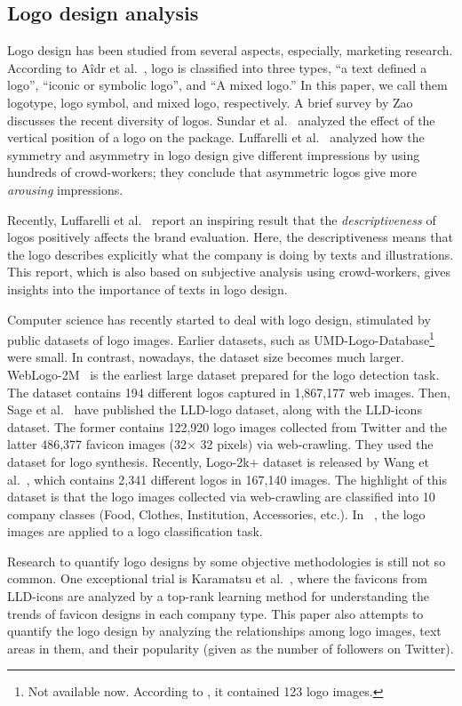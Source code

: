\documentclass[runningheads]{llncs}
\begin{document}
\subsection{Logo design analysis}
Logo design has been studied from several aspects, especially, marketing research.
According to A\^idr et al.~\cite{Adir:2012}, logo is classified into three types, 
``a text defined a logo'', ``iconic or symbolic logo'', and ``A mixed logo.'' In this paper, we call them logotype, logo symbol, and mixed logo, respectively. A brief survey by Zao~\cite{Zhao2017} discusses the recent diversity of logos.
Sundar et al.~\cite{Sundar2014} analyzed the effect of the vertical position of a logo on the package. Luffarelli et al.~\cite{luffarelli2019visual} analyzed how the symmetry and asymmetry in logo design give different impressions by using hundreds of crowd-workers; they conclude that asymmetric logos give more {\it arousing} impressions. \par
%
Recently, Luffarelli et al.~\cite{luffarelli2019} report an inspiring result that the {\it descriptiveness} of logos positively affects the brand evaluation. Here, the descriptiveness means that the logo describes explicitly what the company is doing by texts and illustrations. This report, which is also based on subjective analysis using crowd-workers, gives insights into the importance of texts in logo design. \par
%
Computer science has recently started to deal with logo design, stimulated by public datasets of logo images. Earlier datasets, such as UMD-Logo-Database\footnote{Not available now. According to \cite{Neumann2002}, it contained 123 logo images.} were small. In contrast, nowadays, the dataset size becomes much larger.
WebLogo-2M~\cite{Su:2017} is the earliest large dataset prepared for the logo detection task. The dataset contains 194 different logos captured in 1,867,177 web images. Then, Sage et al.~\cite{Sage:2018} have published the LLD-logo dataset, along with the LLD-icons dataset. The former contains 122,920 logo images collected from Twitter
and the latter 486,377 favicon images (32$\times$ 32 pixels) via web-crawling. They used the dataset for logo synthesis. Recently, Logo-2k+ dataset is released by Wang et al.~\cite{wang2020logo}, which contains 2,341 different logos in 167,140 images.
The highlight of this dataset is that the logo images collected via web-crawling are classified into 10 company classes (Food, Clothes, Institution, Accessories, etc.). In ~\cite{wang2020logo}, the logo images are applied to a logo classification task.\par
%
Research to quantify logo designs by some objective methodologies is still not so 
common. One exceptional trial is Karamatsu et al.~\cite{Karamatsu2019LogoDA}, where the favicons from LLD-icons are analyzed by a top-rank learning method for understanding the trends of favicon designs in each company type. This paper also attempts to quantify the logo design by analyzing the relationships among logo images, text areas in them, and their popularity (given as the number of followers on Twitter).
\end{document}
